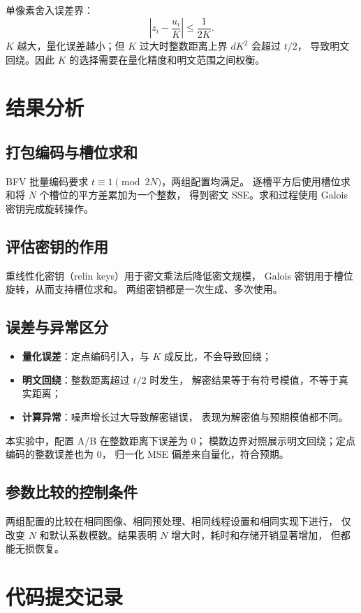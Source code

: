 \documentclass{SYSUReport}
\begin{document}
单像素舍入误差界：
$$\left| z_i - \frac{u_i}{K} \right| \le \frac{1}{2K}.$$
$K$ 越大，量化误差越小；但 $K$ 过大时整数距离上界 $dK^2$ 会超过 $t/2$，
导致明文回绕。因此 $K$ 的选择需要在量化精度和明文范围之间权衡。

\section{结果分析}

\subsection{打包编码与槽位求和}
BFV 批量编码要求 $t \equiv 1 \pmod{2N}$，两组配置均满足。
逐槽平方后使用槽位求和将 $N$ 个槽位的平方差累加为一个整数，
得到密文 SSE。求和过程使用 Galois 密钥完成旋转操作。

\subsection{评估密钥的作用}
重线性化密钥（relin keys）用于密文乘法后降低密文规模，
Galois 密钥用于槽位旋转，从而支持槽位求和。
两组密钥都是一次生成、多次使用。

\subsection{误差与异常区分}
\begin{itemize}
  \item \textbf{量化误差}：定点编码引入，与 $K$ 成反比，不会导致回绕；
  \item \textbf{明文回绕}：整数距离超过 $t/2$ 时发生，
        解密结果等于有符号模值，不等于真实距离；
  \item \textbf{计算异常}：噪声增长过大导致解密错误，
        表现为解密值与预期模值都不同。
\end{itemize}

本实验中，配置 A/B 在整数距离下误差为 0；
模数边界对照展示明文回绕；定点编码的整数误差也为 0，
归一化 MSE 偏差来自量化，符合预期。

\subsection{参数比较的控制条件}
两组配置的比较在相同图像、相同预处理、相同线程设置和相同实现下进行，
仅改变 $N$ 和默认系数模数。结果表明 $N$ 增大时，耗时和存储开销显著增加，
但都能无损恢复。

\section{代码提交记录}
\end{document}
